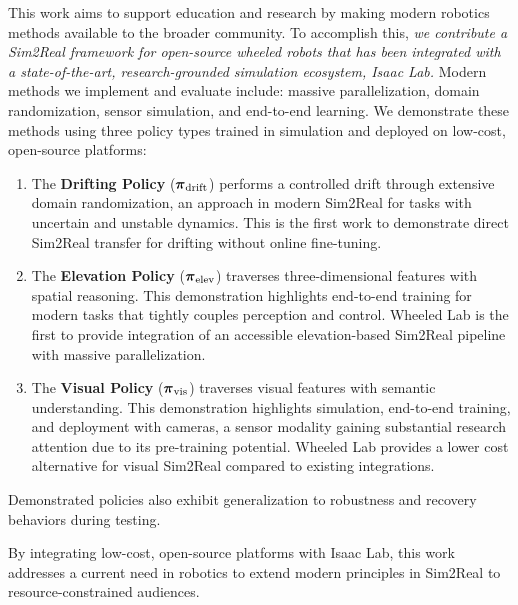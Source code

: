 This work aims to support education and research by making modern robotics methods available to the broader community. To accomplish this, \textit{we contribute a Sim2Real framework for 
open-source wheeled robots that has been integrated with a state-of-the-art, research-grounded  simulation ecosystem, Isaac Lab. }Modern methods we implement and evaluate include: massive parallelization, domain randomization, sensor simulation, and end-to-end learning. We demonstrate these methods using three policy types trained in simulation and deployed on low-cost, open-source platforms:

\begin{enumerate}
    \item The \textbf{Drifting Policy} ($\boldsymbol{\pi}_{\text{drift}}$) performs a controlled drift through extensive domain randomization, an approach in modern Sim2Real for tasks with uncertain and unstable dynamics. This is the first work to demonstrate direct Sim2Real transfer for drifting without online fine-tuning.
    \item The \textbf{Elevation Policy} ($\boldsymbol{\pi}_{\text{elev}}$) traverses three-dimensional features with spatial reasoning. This demonstration highlights end-to-end training for modern tasks that tightly couples perception and control. Wheeled Lab is the first to provide integration of an accessible elevation-based Sim2Real pipeline with massive parallelization.
    \item The \textbf{Visual Policy} ($\boldsymbol{\pi}_{\text{vis}}$) traverses visual features with semantic understanding. This demonstration highlights simulation, end-to-end training, and deployment with cameras, a sensor modality gaining substantial research attention due to its pre-training potential. Wheeled Lab provides a lower cost alternative for visual Sim2Real compared to existing integrations.
\end{enumerate}

Demonstrated policies also exhibit generalization to robustness and recovery behaviors during testing.

By integrating low-cost, open-source platforms with Isaac Lab, this work addresses a current need in robotics to extend modern principles in Sim2Real to resource-constrained audiences. 

